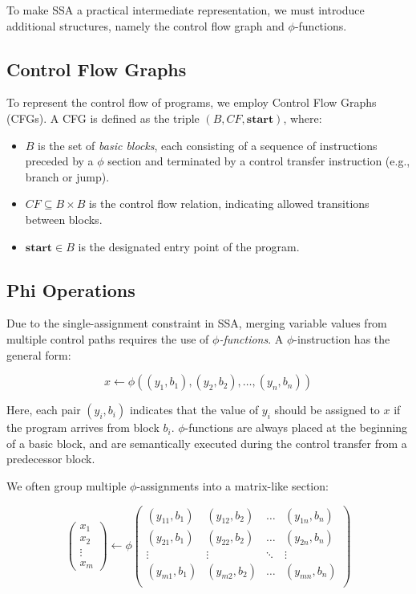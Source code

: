 To make SSA a practical intermediate representation, we must introduce additional structures, namely the control flow graph and $\phi$-functions.

\subsection{Control Flow Graphs}
\label{subsec:cfg}

To represent the control flow of programs, we employ Control Flow Graphs (CFGs). A CFG is defined as the triple $(B, CF, \textbf{start})$, where:

\begin{itemize}
    \item $B$ is the set of \textit{basic blocks}, each consisting of a sequence of instructions preceded by a $\phi$ section and terminated by a control transfer instruction (e.g., branch or jump).
    \item $CF \subseteq B \times B$ is the control flow relation, indicating allowed transitions between blocks.
    \item $\textbf{start} \in B$ is the designated entry point of the program.
\end{itemize}

\subsection{Phi Operations}
\label{subsec:phi}

Due to the single-assignment constraint in SSA, merging variable values from multiple control paths requires the use of \textit{$\phi$-functions}. A $\phi$-instruction has the general form:

\[
x \leftarrow \phi((y_1, b_1), (y_2, b_2), \dots, (y_n, b_n))
\]

Here, each pair $(y_i, b_i)$ indicates that the value of $y_i$ should be assigned to $x$ if the program arrives from block $b_i$. $\phi$-functions are always placed at the beginning of a basic block, and are semantically executed during the control transfer from a predecessor block.

We often group multiple $\phi$-assignments into a matrix-like section:

\[
\begin{pmatrix}
    x_1 \\ x_2 \\ \vdots \\ x_m
\end{pmatrix}
\leftarrow \phi
\begin{pmatrix}
    (y_{11}, b_1) & (y_{12}, b_2) & \dots & (y_{1n}, b_n) \\
    (y_{21}, b_1) & (y_{22}, b_2) & \dots & (y_{2n}, b_n) \\
    \vdots & \vdots & \ddots & \vdots \\
    (y_{m1}, b_1) & (y_{m2}, b_2) & \dots & (y_{mn}, b_n) \\
\end{pmatrix}
\]


